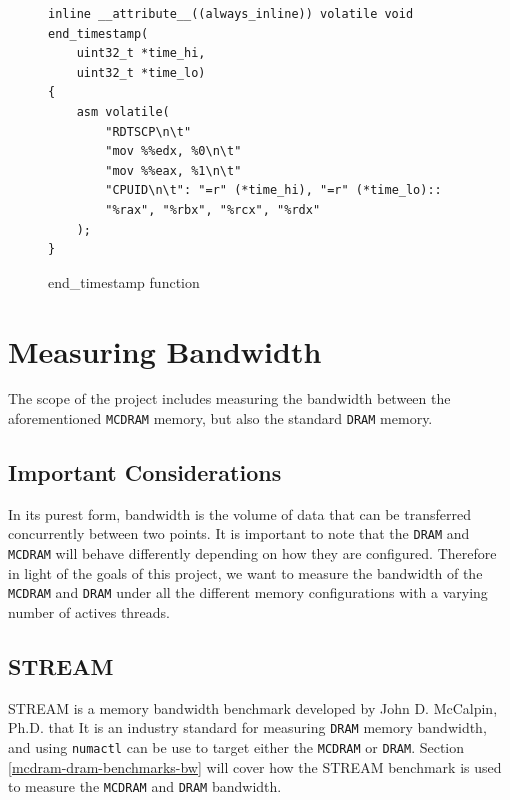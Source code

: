\documentclass[bsc,frontabs,twoside,singlespacing,parskip,deptreport]{infthesis}     %
\begin{document}
\begin{figure}[h!]
    \centering
    \begin{verbatim}
inline __attribute__((always_inline)) volatile void end_timestamp(
    uint32_t *time_hi,
    uint32_t *time_lo)
{
    asm volatile(
        "RDTSCP\n\t"
        "mov %%edx, %0\n\t"
        "mov %%eax, %1\n\t"
        "CPUID\n\t": "=r" (*time_hi), "=r" (*time_lo)::
        "%rax", "%rbx", "%rcx", "%rdx"
    );
}
    \end{verbatim}
    \caption{end\_timestamp function}
    \label{fig:endtimestamp-code}
\end{figure}

\newpage
\section{Measuring Bandwidth}\label{measuring-bandwidth}
The scope of the project includes measuring the bandwidth between the aforementioned \texttt{MCDRAM} memory, but also the standard \texttt{DRAM} memory.

\subsection{Important Considerations}\label{bandwidth_considerations}
In its purest form, bandwidth is the volume of data that can be transferred concurrently between two points. It is important to note that the \texttt{DRAM} and \texttt{MCDRAM} will behave differently depending on how they are configured. Therefore in light of the goals of this project, we want to measure the bandwidth of the \texttt{MCDRAM} and \texttt{DRAM} under all the different memory configurations with a varying number of actives threads.

\subsection{STREAM \cite{McCalpin1995}}
STREAM is a memory bandwidth benchmark developed by John D. McCalpin, Ph.D. that \cite{STREAM_FAQ} It is an industry standard for measuring \texttt{DRAM} memory bandwidth, and using \texttt{numactl}\cite{numactl_repo}\cite{numactl_man} can be use to target either the \texttt{MCDRAM} or \texttt{DRAM}. Section \ref{mcdram-dram-benchmarks-bw} will cover how the STREAM benchmark is used to measure the \texttt{MCDRAM} and \texttt{DRAM} bandwidth.
\end{document}
